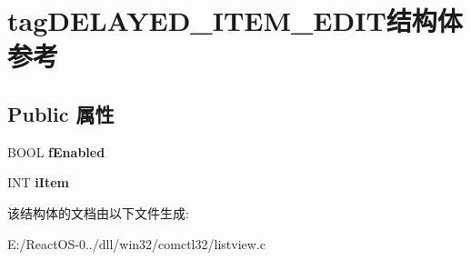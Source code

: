 \hypertarget{structtag_d_e_l_a_y_e_d___i_t_e_m___e_d_i_t}{}\section{tag\+D\+E\+L\+A\+Y\+E\+D\+\_\+\+I\+T\+E\+M\+\_\+\+E\+D\+I\+T结构体 参考}
\label{structtag_d_e_l_a_y_e_d___i_t_e_m___e_d_i_t}
\subsection*{Public 属性}
\begin{DoxyCompactItemize}
\item 
\mbox{\label{structtag_d_e_l_a_y_e_d___i_t_e_m___e_d_i_t_a44f66adc31faac2a949859edc00beb7e}} 
B\+O\+OL {\bfseries f\+Enabled}
\item 
\mbox{\label{structtag_d_e_l_a_y_e_d___i_t_e_m___e_d_i_t_a8befdf37047b7b50d617263695e8bcf3}} 
I\+NT {\bfseries i\+Item}
\end{DoxyCompactItemize}


该结构体的文档由以下文件生成\+:\begin{DoxyCompactItemize}
\item 
E\+:/\+React\+O\+S-\/0../dll/win32/comctl32/listview.\+c\end{DoxyCompactItemize}
